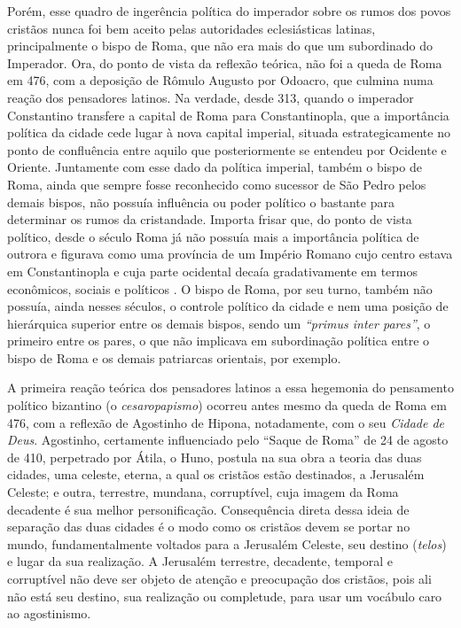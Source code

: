 Porém, esse quadro de ingerência política do imperador sobre os rumos
dos povos cristãos nunca foi bem aceito pelas autoridades eclesiásticas
latinas, principalmente o bispo de Roma, que não era mais do que um
subordinado do Imperador. Ora, do ponto de vista da reflexão teórica,
não foi a queda de Roma em 476, com a deposição de Rômulo Augusto por
Odoacro, que culmina numa reação dos pensadores latinos. Na verdade,
desde 313, quando o imperador Constantino transfere a capital de Roma
para Constantinopla, que a importância política da cidade cede lugar à
nova capital imperial, situada estrategicamente no ponto de confluência
entre aquilo que posteriormente se entendeu por Ocidente e Oriente.
Juntamente com esse dado da política imperial, também o bispo de Roma,
ainda que sempre fosse reconhecido como sucessor de São Pedro pelos
demais bispos, não possuía influência ou poder político o bastante para
determinar os rumos da cristandade. Importa frisar que, do ponto de
vista político, desde o século  Roma já não possuía mais a importância
política de outrora e figurava como uma província de um Império Romano
cujo centro estava em Constantinopla e cuja parte ocidental decaía
gradativamente em termos econômicos, sociais e políticos . O bispo de
Roma, por seu turno, também não possuía, ainda nesses séculos, o
controle político da cidade e nem uma posição de hierárquica superior
entre os demais bispos, sendo um \emph{``primus inter pares''}, o
primeiro entre os pares, o que não implicava em subordinação política
entre o bispo de Roma e os demais patriarcas orientais, por exemplo.

A primeira reação teórica dos pensadores latinos a essa hegemonia do
pensamento político bizantino (o \emph{cesaropapismo}) ocorreu antes
mesmo da queda de Roma em 476, com a reflexão de Agostinho de Hipona,
notadamente, com o seu \emph{Cidade de Deus}. Agostinho, certamente
influenciado pelo ``Saque de Roma'' de 24 de agosto de 410, perpetrado
por Átila, o Huno, postula na sua obra a teoria das duas cidades, uma
celeste, eterna, a qual os cristãos estão destinados, a Jerusalém
Celeste; e outra, terrestre, mundana, corruptível, cuja imagem da Roma
decadente é sua melhor personificação. Consequência direta dessa ideia
de separação das duas cidades é o modo como os cristãos devem se portar
no mundo, fundamentalmente voltados para a Jerusalém Celeste, seu
destino (\emph{telos}) e lugar da sua realização. A Jerusalém terrestre,
decadente, temporal e corruptível não deve ser objeto de atenção e
preocupação dos cristãos, pois ali não está seu destino, sua realização
ou completude, para usar um vocábulo caro ao agostinismo.

